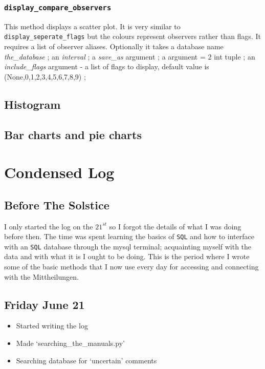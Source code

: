 \documentclass[12pt]{article}
\begin{document}
\subsubsection{\texttt{display\_compare\_observers}}
This method displays a scatter plot. It is very similar to \texttt{display\_seperate\_flags} but the colours represent observers rather than flags. It requires a list of observer aliases. Optionally it takes a database name \textit{the\_database} ; an \textit{interval} ; a \textit{save\_as} argument ; a  argument = 2 int tuple ; an \textit{include\_flags} argument - a list of flags to display, default value is (None,0,1,2,3,4,5,6,7,8,9) ; 



\subsection{Histogram}

\subsection{Bar charts and pie charts}


\section{Condensed Log}

\subsection{Before The Solstice}
I only started the log on the $21^{st}$ so I forgot the details of what I was doing before then. The time was spent learning the basics of \texttt{SQL} and how to interface with an \texttt{SQL} database through the mysql terminal; acquainting myself with the data and with what it is I ought to be doing. This is the period where I wrote some of the basic methods that I now use every day for accessing and connecting with the Mittheilungen.

\subsection{Friday June 21}
\begin{itemize}
    \item Started writing the log
    \item Made `searching\_the\_manuals.py'
    \item Searching database for `uncertain' comments
\end{itemize}
    
\end{document}
